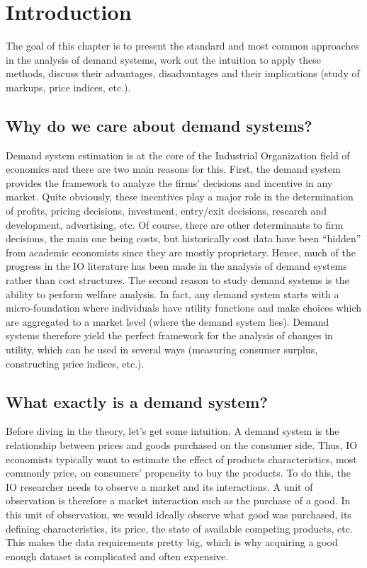 \section{Introduction}

The goal of this chapter is to present the standard and most common approaches in the analysis of demand systems, work out the intuition to apply these methods, discuss their advantages, disadvantages and their implications (study of markups, price indices, etc.).

\subsection{Why do we care about demand systems?}

Demand system estimation is at the core of the Industrial Organization field of economics and there are two main reasons for this. First, the demand system provides the framework to analyze the firms' decisions and incentive in any market. Quite obviously, these incentives play a major role in the determination of profits, pricing decisions, investment, entry/exit decisions, research and development, advertising, etc. Of course, there are other determinants to firm decisions, the main one being costs, but historically cost data have been ``hidden'' from academic economists since they are mostly proprietary. Hence, much of the progress in the IO literature has been made in the analysis of demand systems rather than cost structures. The second reason to study demand systems is the ability to perform welfare analysis. In fact, any demand system starts with a micro-foundation where individuals have utility functions and make choices which are aggregated to a market level (where the demand system lies). Demand systems therefore yield the perfect framework for the analysis of changes in utility, which can be used in several ways (measuring consumer surplus, constructing price indices, etc.).

\subsection{What exactly is a demand system?}

Before diving in the theory, let's get some intuition. A demand system is the relationship between prices and goods purchased on the consumer side. Thus, IO economists typically want to estimate the effect of products characteristics, most commonly price, on consumers' propensity to buy the products. To do this, the IO researcher needs to observe a market and its interactions. A unit of observation is therefore a market interaction such as the purchase of a good. In this unit of observation, we would ideally observe what good was purchased, its defining characteristics, its price, the state of available competing products, etc. This makes the data requirements pretty big, which is why acquiring a good enough dataset is complicated and often expensive.

